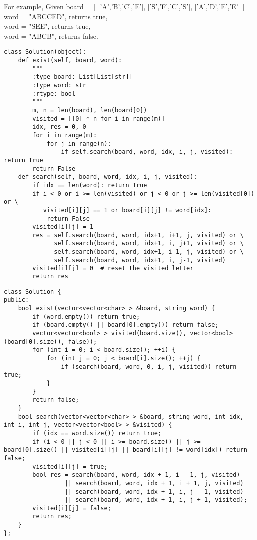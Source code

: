 For example,
Given board =
[
  ['A','B','C','E'],
  ['S','F','C','S'],
  ['A','D','E','E']
]\\

word = "ABCCED", returns true,\\
word = "SEE", returns true,\\
word = "ABCB", returns false.\\

\begin{lstlisting}
class Solution(object):
    def exist(self, board, word):
        """
        :type board: List[List[str]]
        :type word: str
        :rtype: bool
        """
        m, n = len(board), len(board[0])
        visited = [[0] * n for i in range(m)]
        idx, res = 0, 0
        for i in range(m):
            for j in range(n):
                if self.search(board, word, idx, i, j, visited): return True
        return False
    def search(self, board, word, idx, i, j, visited):
        if idx == len(word): return True
        if i < 0 or i >= len(visited) or j < 0 or j >= len(visited[0]) or \
           visited[i][j] == 1 or board[i][j] != word[idx]:
            return False
        visited[i][j] = 1
        res = self.search(board, word, idx+1, i+1, j, visited) or \
              self.search(board, word, idx+1, i, j+1, visited) or \
              self.search(board, word, idx+1, i-1, j, visited) or \
              self.search(board, word, idx+1, i, j-1, visited)
        visited[i][j] = 0  # reset the visited letter
        return res
\end{lstlisting}

\begin{lstlisting}
class Solution {
public:
    bool exist(vector<vector<char> > &board, string word) {
        if (word.empty()) return true;
        if (board.empty() || board[0].empty()) return false;
        vector<vector<bool> > visited(board.size(), vector<bool>(board[0].size(), false));
        for (int i = 0; i < board.size(); ++i) {
            for (int j = 0; j < board[i].size(); ++j) {
                if (search(board, word, 0, i, j, visited)) return true;
            }
        }
        return false;
    }
    bool search(vector<vector<char> > &board, string word, int idx, int i, int j, vector<vector<bool> > &visited) {
        if (idx == word.size()) return true;
        if (i < 0 || j < 0 || i >= board.size() || j >= board[0].size() || visited[i][j] || board[i][j] != word[idx]) return false;
        visited[i][j] = true;
        bool res = search(board, word, idx + 1, i - 1, j, visited) 
                 || search(board, word, idx + 1, i + 1, j, visited)
                 || search(board, word, idx + 1, i, j - 1, visited)
                 || search(board, word, idx + 1, i, j + 1, visited);
        visited[i][j] = false;
        return res;
    }
};
\end{lstlisting}


